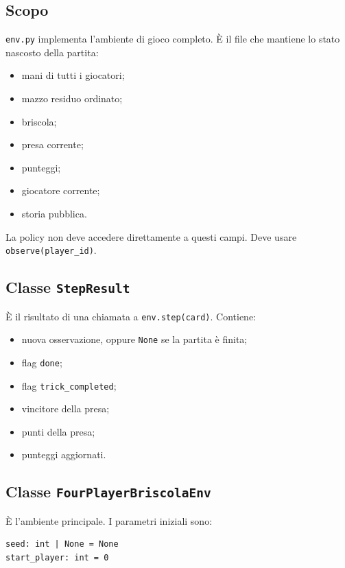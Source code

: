 \documentclass[11pt,a4paper]{article}
\begin{document}
\subsection{Scopo}

\texttt{env.py} implementa l'ambiente di gioco completo. È il file che mantiene
lo stato nascosto della partita:

\begin{itemize}
  \item mani di tutti i giocatori;
  \item mazzo residuo ordinato;
  \item briscola;
  \item presa corrente;
  \item punteggi;
  \item giocatore corrente;
  \item storia pubblica.
\end{itemize}

La policy non deve accedere direttamente a questi campi. Deve usare
\texttt{observe(player\_id)}.

\subsection{Classe \texttt{StepResult}}

È il risultato di una chiamata a \texttt{env.step(card)}. Contiene:

\begin{itemize}
  \item nuova osservazione, oppure \texttt{None} se la partita è finita;
  \item flag \texttt{done};
  \item flag \texttt{trick\_completed};
  \item vincitore della presa;
  \item punti della presa;
  \item punteggi aggiornati.
\end{itemize}

\subsection{Classe \texttt{FourPlayerBriscolaEnv}}

È l'ambiente principale. I parametri iniziali sono:

\begin{verbatim}
seed: int | None = None
start_player: int = 0
\end{verbatim}
\end{document}
